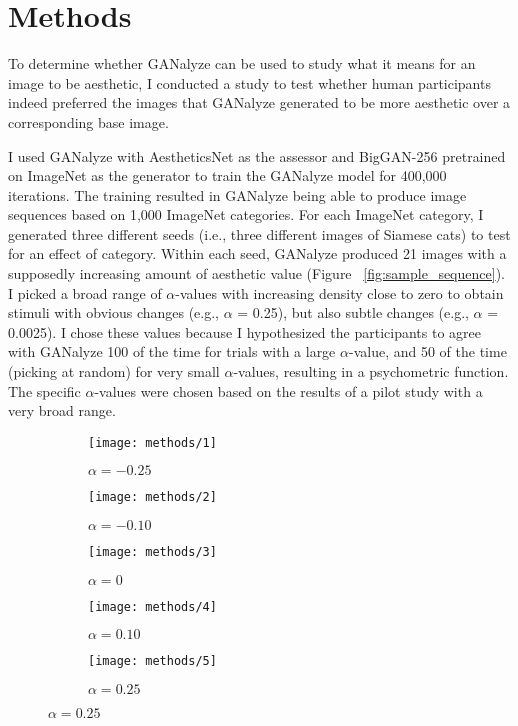 \documentclass[../main.tex]{subfiles}
\begin{document}
\section{Methods}
To determine whether GANalyze \parencite{goetschalckxGANalyzeVisualDefinitions2019} can be used to study what it means for an image to be aesthetic, I conducted a study to test whether human participants indeed preferred the images that GANalyze generated to be more aesthetic over a corresponding base image.

I used GANalyze with AestheticsNet \parencite{kongPhotoAestheticsRanking2016} as the assessor and BigGAN-256 \parencite{brockLargeScaleGAN2019} pretrained on ImageNet \parencite{russakovskyImageNetLargeScale2015} as the generator to train the GANalyze model for 400,000 iterations. The training resulted in GANalyze being able to produce image sequences based on 1,000 ImageNet categories. For each ImageNet category, I generated three different seeds (i.e., three different images of Siamese cats) to test for an effect of category. Within each seed, GANalyze produced 21 images with a supposedly increasing amount of aesthetic value (Figure ~\ref{fig:sample_sequence}). I picked a broad range of $\alpha$-values with increasing density close to zero to obtain stimuli with obvious changes (e.g., $\alpha$ = 0.25), but also subtle changes (e.g., $\alpha$ = 0.0025). I chose these values because I hypothesized the participants to agree with GANalyze 100 of the time for trials with a large $\alpha$-value, and 50 of the time (picking at random) for very small $\alpha$-values, resulting in a psychometric function. The specific $\alpha$-values were chosen based on the results of a pilot study with a very broad range.

\begin{figure}[ht]
	\caption{Truncated Sample of an Image Sequence from One Seed Produced by GANalyze}
	\label{fig:sample_sequence}
	\centering
	\begin{subfigure}{.18\textwidth}
		\centering
		\texttt{[image: methods/1]}
		\caption{\centering $\alpha = -0.25$}
	\end{subfigure} \hfill
	\begin{subfigure}{.18\textwidth}
		\centering
		\texttt{[image: methods/2]}
		\caption{\centering $\alpha = -0.10$}
	\end{subfigure} \hfill
	\begin{subfigure}{.18\textwidth}
		\centering
		\texttt{[image: methods/3]}
		\caption{\centering $\alpha = 0$}
	\end{subfigure} \hfill
	\begin{subfigure}{.18\textwidth}
		\centering
		\texttt{[image: methods/4]}
		\caption{\centering $\alpha = 0.10$}
	\end{subfigure} \hfill
	\begin{subfigure}{.18\textwidth}
		\centering
		\texttt{[image: methods/5]}
		\caption{\centering $\alpha = 0.25$}
	\end{subfigure} \hfill
\end{figure}
\end{document}
